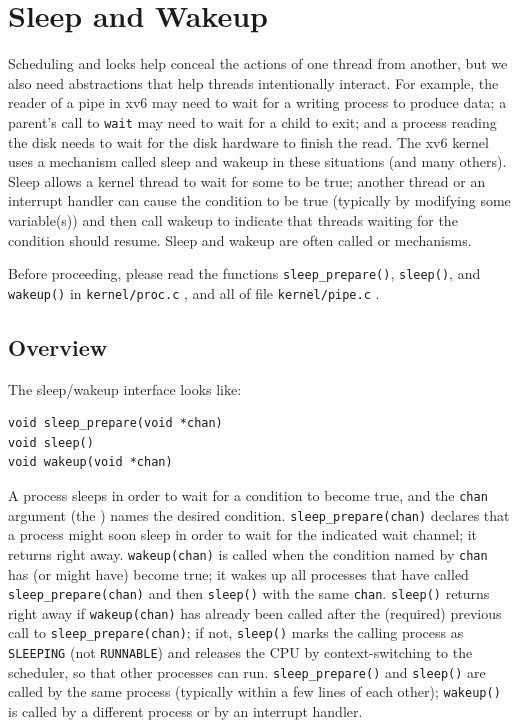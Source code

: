\chapter{Sleep and Wakeup}
\label{CH:SLEEP}

Scheduling and locks help conceal the actions of one thread
from another,
but we also need abstractions that help
threads intentionally interact.
For example, the reader of a pipe in xv6 may need to wait
for a writing process to produce data;
a parent's call to \lstinline{wait} may need to
wait for a child to exit; and
a process reading the disk needs to wait
for the disk hardware to finish the read.
The xv6 kernel uses a mechanism called sleep and wakeup
in these situations (and many others).
Sleep allows a kernel thread to
wait for some  to be true; another thread
or an interrupt handler can cause the condition
to be true (typically by modifying some variable(s))
and then call wakeup
to indicate that threads waiting for the condition should resume.
Sleep and wakeup are often called 
or 
mechanisms.

Before proceeding, please read the functions
{\tt sleep\_prepare()},
{\tt sleep()}, and {\tt
  wakeup()} in \lstinline{kernel/proc.c} , and all of file \lstinline{kernel/pipe.c} .

\section{Overview}

The sleep/wakeup interface looks like:

\begin{lstlisting}
void sleep_prepare(void *chan)
void sleep()
void wakeup(void *chan)
\end{lstlisting}

A process sleeps in order to wait for a condition
to become true, and the {\tt chan}
argument (the ) names the desired condition.
\lstinline{sleep_prepare(chan)} declares that a process might soon
sleep in order to wait for the indicated wait channel; it returns
right away. \lstinline{wakeup(chan)} is called when the condition named by
\lstinline{chan} has (or might have) become true; it wakes up all
processes that have called \lstinline{sleep_prepare(chan)} and
then \lstinline{sleep()} with the same \lstinline{chan}.
\lstinline{sleep()} returns right away if \lstinline{wakeup(chan)} has
already been called after the (required) previous call to
\lstinline{sleep_prepare(chan)}; if not, \lstinline{sleep()} marks the
calling process as \lstinline{SLEEPING} (not \lstinline{RUNNABLE}) and
releases the CPU by context-switching to the scheduler, so that other
processes can run. \lstinline{sleep_prepare()} and \lstinline{sleep()}
are called by the same process (typically within a few lines of each
other); \lstinline{wakeup()} is called by a different process or by an
interrupt handler.

